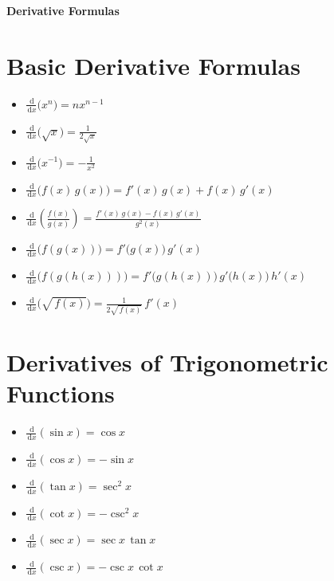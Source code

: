 \documentclass[12pt]{article}
\newcommand{\dd}{\, \mathrm{d}}
\begin{document}
\begin{center}
    {\LARGE\bfseries Derivative Formulas}
\end{center}
\vspace{0.5cm}

\section*{Basic Derivative Formulas}
\begin{itemize}
    \item $\displaystyle \frac{\dd}{\dd x}\bigl(x^n\bigr) = n x^{n-1}$
    \item $\displaystyle \frac{\dd}{\dd x}\bigl(\sqrt{x}\bigr) = \frac{1}{2\sqrt{x}}$
    \item $\displaystyle \frac{\dd}{\dd x}\bigl(x^{-1}\bigr) = -\frac{1}{x^{2}}$
    \item $\displaystyle \frac{\dd}{\dd x}\bigl(f(x)\,g(x)\bigr) = f'(x)\,g(x) + f(x)\,g'(x)$
    \item $\displaystyle \frac{\dd}{\dd x}\left( \frac{f(x)}{g(x)} \right) = \frac{f'(x)\,g(x) - f(x)\,g'(x)}{g^{2}(x)}$
    \item $\displaystyle \frac{\dd}{\dd x}\bigl(f(g(x))\bigr) = f'\bigl(g(x)\bigr)\, g'(x)$
    \item $\displaystyle \frac{\dd}{\dd x}\bigl(f(g(h(x)))\bigr) = f'\bigl(g(h(x))\bigr)\, g'\bigl(h(x)\bigr)\, h'(x)$
    \item $\displaystyle \frac{\dd}{\dd x}\bigl(\sqrt{\,f(x)}\bigr) = \frac{1}{2\sqrt{\,f(x)}}\, f'(x)$
\end{itemize}

\section*{Derivatives of Trigonometric Functions}
\begin{itemize}
    \item $\displaystyle \frac{\dd}{\dd x}(\sin x) = \cos x$
    \item $\displaystyle \frac{\dd}{\dd x}(\cos x) = -\sin x$
    \item $\displaystyle \frac{\dd}{\dd x}(\tan x) = \sec^{2}x$
    \item $\displaystyle \frac{\dd}{\dd x}(\cot x) = -\csc^{2}x$
    \item $\displaystyle \frac{\dd}{\dd x}(\sec x) = \sec x\, \tan x$
    \item $\displaystyle \frac{\dd}{\dd x}(\csc x) = -\csc x\, \cot x$
\end{itemize}
\end{document}
